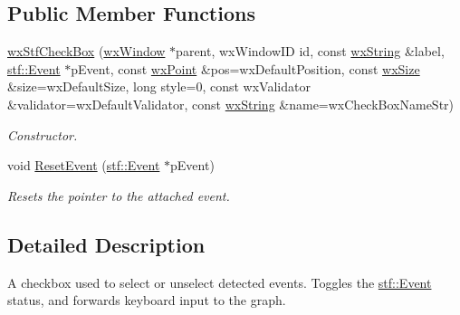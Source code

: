 \subsection*{Public Member Functions}
\begin{DoxyCompactItemize}
\item 
\hyperlink{classwxStfCheckBox_a9c976112e0951a799ff63f6c491a159b}{wxStfCheckBox} (\hyperlink{classwxWindow}{wxWindow} $\ast$parent, wxWindowID id, const \hyperlink{classwxString}{wxString} \&label, \hyperlink{classstf_1_1Event}{stf::Event} $\ast$pEvent, const \hyperlink{classwxPoint}{wxPoint} \&pos=wxDefaultPosition, const \hyperlink{classwxSize}{wxSize} \&size=wxDefaultSize, long style=0, const wxValidator \&validator=wxDefaultValidator, const \hyperlink{classwxString}{wxString} \&name=wxCheckBoxNameStr)
\begin{DoxyCompactList}\small\item\em Constructor. \item\end{DoxyCompactList}\item 
void \hyperlink{classwxStfCheckBox_a29d01f441967d73be7fa05e9d722fd5d}{ResetEvent} (\hyperlink{classstf_1_1Event}{stf::Event} $\ast$pEvent)
\begin{DoxyCompactList}\small\item\em Resets the pointer to the attached event. \item\end{DoxyCompactList}\end{DoxyCompactItemize}


\subsection{Detailed Description}
A checkbox used to select or unselect detected events. Toggles the \hyperlink{classstf_1_1Event}{stf::Event} status, and forwards keyboard input to the graph. 

